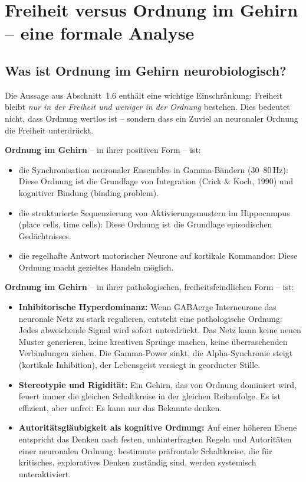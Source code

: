 ﻿\documentclass[12pt,a4paper]{report}
\theoremstyle{plain}
\theoremstyle{definition}
\theoremstyle{remark}
\begin{document}
	\section{Freiheit versus Ordnung im Gehirn -- eine formale Analyse}

	\subsection{Was ist Ordnung im Gehirn neurobiologisch?}

	Die Aussage aus Abschnitt~1.6 enthält eine wichtige Einschränkung:
	Freiheit bleibt \emph{nur in der Freiheit und weniger in der Ordnung}
	bestehen. Dies bedeutet nicht, dass Ordnung wertlos ist --
	sondern dass ein Zuviel an neuronaler Ordnung die Freiheit unterdrückt.

	\textbf{Ordnung im Gehirn} -- in ihrer positiven Form -- ist:
	\begin{itemize}
		\item die Synchronisation neuronaler Ensembles in Gamma-Bändern
		($30$--$80$\,Hz): Diese Ordnung ist die Grundlage von Integration
		(Crick \& Koch, 1990) und kognitiver Bindung (binding problem).
		\item die strukturierte Sequenzierung von Aktivierungsmustern
		im Hippocampus (place cells, time cells): Diese Ordnung
		ist die Grundlage episodischen Gedächtnisses.
		\item die regelhafte Antwort motorischer Neurone auf kortikale
		Kommandos: Diese Ordnung macht gezieltes Handeln möglich.
	\end{itemize}

	\textbf{Ordnung im Gehirn} -- in ihrer pathologischen, freiheitsfeindlichen Form -- ist:
	\begin{itemize}
		\item \textbf{Inhibitorische Hyperdominanz:}
		Wenn GABAerge Interneurone das neuronale Netz zu stark regulieren,
		entsteht eine pathologische Ordnung: Jedes abweichende Signal
		wird sofort unterdrückt. Das Netz kann keine neuen Muster
		generieren, keine kreativen Sprünge machen, keine
		überraschenden Verbindungen ziehen. Die Gamma-Power sinkt,
		die Alpha-Synchronie steigt (kortikale Inhibition), der
		Lebensgeist versiegt in geordneter Stille.
		\item \textbf{Stereotypie und Rigidität:}
		Ein Gehirn, das von Ordnung dominiert wird, feuert immer
		die gleichen Schaltkreise in der gleichen Reihenfolge.
		Es ist effizient, aber unfrei: Es kann nur das Bekannte denken.
		\item \textbf{Autoritätsgläubigkeit als kognitive Ordnung:}
		Auf einer höheren Ebene entspricht das Denken nach festen,
		un\-hin\-ter\-frag\-ten Regeln und Autoritäten einer neuronalen
		Ordnung: bestimmte präfrontale Schaltkreise, die für
		kritisches, exploratives Denken zuständig sind,
		werden systemisch unteraktiviert.
	\end{itemize}
\end{document}

